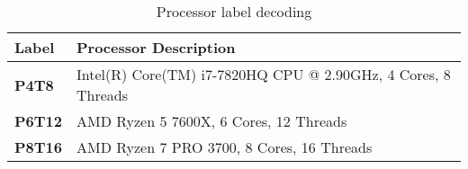 
\begin{table}[ht]
\centering
\caption{Processor label decoding}
\label{tab:processor_decoding}
\begin{tabular}{l|l}
\hline
\textbf{Label} & \textbf{Processor Description} \\
\hline
\textbf{P4T8} & Intel(R) Core(TM) i7-7820HQ CPU @ 2.90GHz, 4 Cores, 8 Threads \\ \hline
\textbf{P6T12} & AMD Ryzen 5 7600X, 6 Cores, 12 Threads \\ \hline
\textbf{P8T16} & AMD Ryzen 7 PRO 3700, 8 Cores, 16 Threads \\ \hline

\end{tabular}
\end{table}
